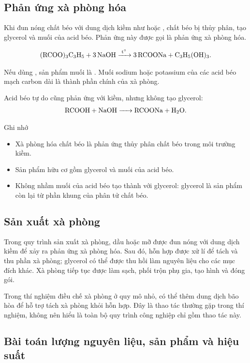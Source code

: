 \subsection{Phản ứng xà phòng hóa}

Khi đun nóng chất béo với dung dịch kiềm như  hoặc , chất béo bị thủy phân, tạo glycerol và muối của acid béo. Phản ứng này được gọi là phản ứng xà phòng hóa.

\[
\ce{(RCOO)3C3H5 + 3NaOH ->[t^\circ] 3RCOONa + C3H5(OH)3}.
\]

Nếu dùng , sản phẩm muối là . Muối sodium hoặc potassium của các acid béo mạch carbon dài là thành phần chính của xà phòng.

Acid béo tự do cũng phản ứng với kiềm, nhưng không tạo glycerol:
\[
\ce{RCOOH + NaOH -> RCOONa + H2O}.
\]

\begin{ghinho}{Ghi nhớ}
\begin{itemize}
\item Xà phòng hóa chất béo là phản ứng thủy phân chất béo trong môi trường kiềm.
\item Sản phẩm hữu cơ gồm glycerol và muối của acid béo.
\item Không nhầm muối của acid béo tạo thành với glycerol: glycerol là sản phẩm còn lại từ phần khung của phân tử chất béo.
\end{itemize}
\end{ghinho}

\subsection{Sản xuất xà phòng}

Trong quy trình sản xuất xà phòng, dầu hoặc mỡ được đun nóng với dung dịch kiềm để xảy ra phản ứng xà phòng hóa. Sau đó, hỗn hợp được xử lí để tách và thu phần xà phòng; glycerol có thể được thu hồi làm nguyên liệu cho các mục đích khác. Xà phòng tiếp tục được làm sạch, phối trộn phụ gia, tạo hình và đóng gói.

Trong thí nghiệm điều chế xà phòng ở quy mô nhỏ, có thể thêm dung dịch  bão hòa để hỗ trợ tách xà phòng khỏi hỗn hợp. Đây là thao tác thường gặp trong thí nghiệm, không nên hiểu là toàn bộ quy trình công nghiệp chỉ gồm thao tác này.

\subsection{Bài toán lượng nguyên liệu, sản phẩm và hiệu suất}

